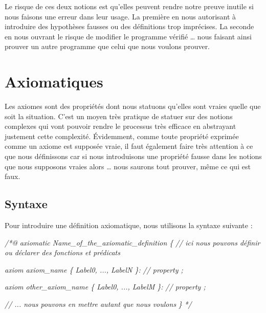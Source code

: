\documentclass[12pt,francais,]{scrbook}
\newenvironment{Shaded}{}{}
\newcommand{\CommentTok}[1]{\textcolor[rgb]{0.38,0.63,0.69}{\textit{{#1}}}}
\begin{document}
Le risque de ces deux notions est qu'elles peuvent rendre notre preuve
inutile si nous faisons une erreur dans leur usage. La première en nous
autorisant à introduire des hypothèses fausses ou des définitions trop
imprécises. La seconde en nous ouvrant le risque de modifier le
programme vérifié \ldots{} nous faisant ainsi prouver un autre programme
que celui que nous voulons prouver.

\section{Axiomatiques}\label{axiomatiques}

Les axiomes sont des propriétés dont nous statuons qu'elles sont vraies
quelle que soit la situation. C'est un moyen très pratique de statuer
sur des notions complexes qui vont pouvoir rendre le processus très
efficace en abstrayant justement cette complexité. Évidemment, comme
toute propriété exprimée comme un axiome est supposée vraie, il faut
également faire très attention à ce que nous définissons car si nous
introduisons une propriété fausse dans les notions que nous supposons
vraies alors \ldots{} nous saurons tout prouver, même ce qui est faux.

\subsection{Syntaxe}\label{syntaxe-3}

Pour introduire une définition axiomatique, nous utilisons la syntaxe
suivante :

\begin{footnotesize}\begin{Shaded}
\begin{Highlighting}[]
\CommentTok{/*@}
\CommentTok{  axiomatic Name_of_the_axiomatic_definition \{}
\CommentTok{    // ici nous pouvons définir ou déclarer des fonctions et prédicats}

\CommentTok{    axiom axiom_name \{ Label0, ..., LabelN \}:}
\CommentTok{      // property ;}

\CommentTok{    axiom other_axiom_name \{ Label0, ..., LabelM \}:}
\CommentTok{      // property ;}

\CommentTok{    // ... nous pouvons en mettre autant que nous voulons}
\CommentTok{  \}}
\CommentTok{*/}
\end{Highlighting}
\end{Shaded}\end{footnotesize}
\end{document}
